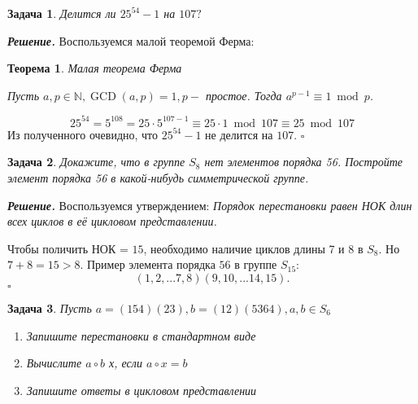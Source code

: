 \documentclass[12pt]{article}
\newtheorem{problem}{Задача}
\newenvironment{solution}[1][\it{Решение}]{\textbf{#1. } }{$\square$}
\newtheorem{theorem}{Теорема}[section]
\begin{document}
\begin{problem}
    Делится ли $25^{54}-1$ на $107 ?$
\end{problem}
\begin{solution}
    Воспользуемся малой теоремой Ферма:
    \begin{theorem}{Малая теорема Ферма}
    
        Пусть $a, p \in \mathbb{N}, \operatorname{GCD}(a, p)=1, p-$ простое. Тогда $a^{p-1} \equiv 1 \bmod p$.
    \end{theorem}
    $$
    25^{54}= 5^{108} = 25 \cdot 5^{107 - 1} \equiv 25 \cdot 1 \bmod{107} \equiv 25 \bmod{107}
    $$
    Из полученного очевидно, что $25^{54} - 1$ не делится на $107$.
\end{solution}
\begin{problem}
    Докажите, что в группе $S_8$ нет элементов порядка 56. Постройте элемент порядка 56 в какой-нибудь симметрической группе.
\end{problem}

\begin{solution}
    Воспользуемся утверждением: \textit{Порядок перестановки равен НОК длин всех циклов в её цикловом представлении.}

    Чтобы поличить НОК = $15$, необходимо наличие циклов длины 7 и 8 в $S_8$. Но $7 + 8 = 15 > 8$. Пример элемента порядка $56$ в группе $S_{15}$: $$(1,2,...7,8)(9,10,...14, 15).$$
\end{solution}

\begin{problem}
    Пусть $a=(154)(23), b=(12)(5364), a, b \in S_6$
    \begin{enumerate}
        \item Запишите перестановки в стандартном виде
        \item  Вычислите $a \circ b$
         х, если $a \circ x=b$
        \item Запишите ответы в цикловом представлении
    \end{enumerate}
\end{problem}
\end{document}

